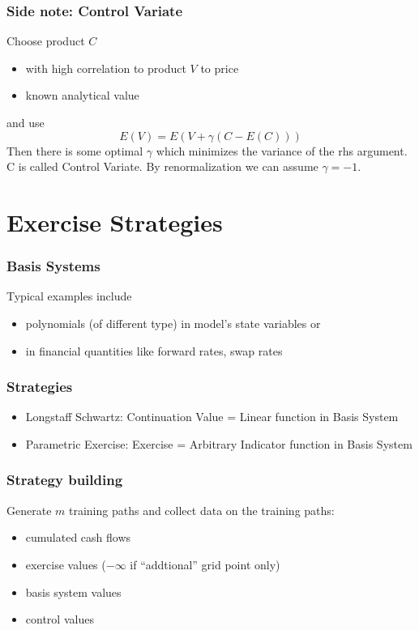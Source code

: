 \documentclass{beamer}
\begin{document}
\begin{frame}
\frametitle{Side note: Control Variate}
Choose product $C$
\begin{itemize}
\item with high correlation to product $V$ to price
\item known analytical value
\end{itemize}
and use
\begin{equation}
E(V) = E(V+\gamma(C-E(C)))
\end{equation}
Then there is some optimal $\gamma$ which minimizes the variance of the rhs argument. C is called Control Variate. By renormalization we can assume $\gamma = -1$.
\end{frame}

\section{Exercise Strategies}

\begin{frame}
\frametitle{Basis Systems}
Typical examples include
\begin{itemize}
\item polynomials (of different type) in model's state variables or
\item in financial quantities like forward rates, swap rates
\end{itemize}
\end{frame}

\begin{frame}
\frametitle{Strategies}
\begin{itemize}
\item Longstaff Schwartz: Continuation Value = Linear function in Basis System
\item Parametric Exercise: Exercise = Arbitrary Indicator function in Basis System
\end{itemize}
\end{frame}

\begin{frame}
\frametitle{Strategy building}
Generate $m$ training paths and collect data on the training paths:
\begin{itemize}
\item cumulated cash flows
\item exercise values ($-\infty$ if ``addtional'' grid point only)
\item basis system values
\item control values
\end{itemize}
\end{frame}
\end{document}

